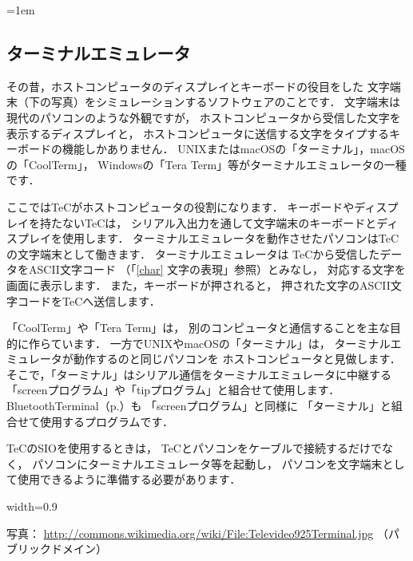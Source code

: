 \newpage
\begin{framed}{\parindent=1em
    \subsection*{ターミナルエミュレータ}\label{terminal}{\small
      その昔，ホストコンピュータのディスプレイとキーボードの役目をした
      文字端末（下の写真）をシミュレーションするソフトウェアのことです．
      文字端末は現代のパソコンのような外観ですが，
      ホストコンピュータから受信した文字を表示するディスプレイと，
      ホストコンピュータに送信する文字をタイプするキーボードの機能しかありません．
      UNIXまたはmacOSの「ターミナル」，macOSの「CoolTerm」，
      Windowsの「Tera Term」等がターミナルエミュレータの一種です．

      ここではTeCがホストコンピュータの役割になります．
      キーボードやディスプレイを持たないTeCは，
      シリアル入出力を通して文字端末のキーボードとディスプレイを使用します．
      ターミナルエミュレータを動作させたパソコンはTeCの文字端末として働きます．
      ターミナルエミュレータは
      TeCから受信したデータをASCII文字コード
      （「\ref{char} 文字の表現」参照）とみなし，
      対応する文字を画面に表示します．
      また，キーボードが押されると，
      押された文字のASCII文字コードをTeCへ送信します．

      「CoolTerm」や「Tera Term」は，
      別のコンピュータと通信することを主な目的に作らています．
      一方でUNIXやmacOSの「ターミナル」は，
      ターミナルエミュレータが動作するのと同じパソコンを
      ホストコンピュータと見做します．
      そこで，「ターミナル」はシリアル通信をターミナルエミュレータに中継する
      「screenプログラム」や「tipプログラム」と組合せて使用します．
      BluetoothTerminal（p.\pageref{BluetoothTerminal}）も
      「screenプログラム」と同様に
      「ターミナル」と組合せて使用するプログラムです．

      TeCのSIOを使用するときは，
      TeCとパソコンをケーブルで接続するだけでなく，
      パソコンにターミナルエミュレータ等を起動し，
      パソコンを文字端末として使用できるように準備する必要があります．
      \begin{center}
                          {width=0.9\columnwidth}
      \end{center}
      写真：
      \url{http://commons.wikimedia.org/wiki/File:Televideo925Terminal.jpg}
          （パブリックドメイン）
}}\end{framed}

